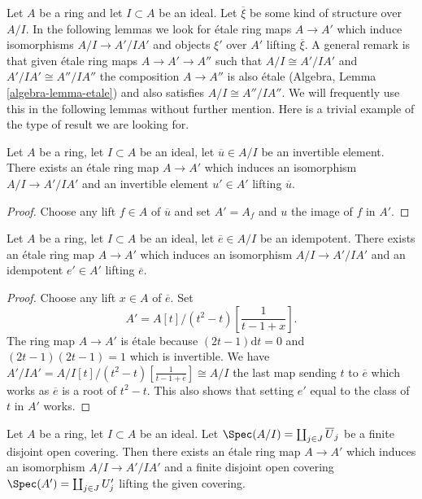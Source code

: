 \medskip\noindent
Let $A$ be a ring and let $I \subset A$ be an ideal. Let $\overline{\xi}$
be some kind of structure over $A/I$. In the following lemmas we look for
\'etale ring maps $A \to A'$ which induce isomorphisms $A/I \to A'/IA'$
and objects $\xi'$ over $A'$ lifting $\overline{\xi}$. A general remark is
that given \'etale ring maps $A \to A' \to A''$ such that
$A/I \cong A'/IA'$ and $A'/IA' \cong A''/IA''$ the composition
$A \to A''$ is also \'etale (Algebra, Lemma \ref{algebra-lemma-etale})
and also satisfies $A/I \cong A''/IA''$.
We will frequently use this in the following lemmas without further mention.
Here is a trivial example of the type of result we are looking for.

\begin{lemma}
\label{lemma-lift-invertible-element}
Let $A$ be a ring, let $I \subset A$ be an ideal, let $\overline{u} \in A/I$
be an invertible element. There exists an \'etale ring map $A \to A'$ which
induces an isomorphism $A/I \to A'/IA'$ and an invertible element $u' \in A'$
lifting $\overline{u}$.
\end{lemma}

\begin{proof}
Choose any lift $f \in A$ of $\overline{u}$ and set $A' = A_f$ and $u$
the image of $f$ in $A'$.
\end{proof}

\begin{lemma}
\label{lemma-lift-idempotent}
Let $A$ be a ring, let $I \subset A$ be an ideal, let $\overline{e} \in A/I$
be an idempotent. There exists an \'etale ring map $A \to A'$ which
induces an isomorphism $A/I \to A'/IA'$ and an idempotent $e' \in A'$
lifting $\overline{e}$.
\end{lemma}

\begin{proof}
Choose any lift $x \in A$ of $\overline{e}$. Set
$$
A' = A[t]/(t^2 - t)\left[\frac{1}{t - 1 + x}\right].
$$
The ring map $A \to A'$ is \'etale because $(2t - 1)\text{d}t = 0$
and $(2t - 1)(2t - 1) = 1$ which is invertible. We have
$A'/IA' = A/I[t]/(t^2 - t)[\frac{1}{t - 1 + \overline{e}}] \cong A/I$
the last map sending $t$ to $\overline{e}$ which works as
$\overline{e}$ is a root of $t^2 - t$. This also shows that setting
$e'$ equal to the class of $t$ in $A'$ works.
\end{proof}

\begin{lemma}
\label{lemma-lift-open-covering}
Let $A$ be a ring, let $I \subset A$ be an ideal. Let
$\Spec(A/I) = \coprod_{j \in J} \overline{U}_j$ be a finite disjoint open
covering. Then there exists an \'etale ring map $A \to A'$ which
induces an isomorphism $A/I \to A'/IA'$ and a finite disjoint open covering
$\Spec(A') = \coprod_{j \in J} U'_j$ lifting the given covering.
\end{lemma}

